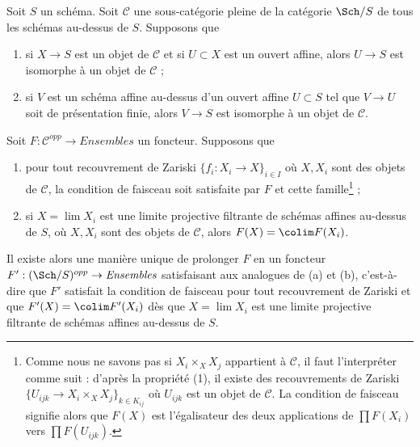 \begin{lemma}
\label{lemma-extend}
Soit $S$ un schéma. Soit $\mathcal{C}$ une sous-catégorie pleine
de la catégorie $\Sch/S$ de tous les schémas au-dessus de $S$. Supposons que
\begin{enumerate}
\item si $X \to S$ est un objet de $\mathcal{C}$ et si
$U \subset X$ est un ouvert affine, alors $U \to S$ est isomorphe
à un objet de $\mathcal{C}$ ;
\item si $V$ est un schéma affine au-dessus d'un ouvert affine $U \subset S$
tel que $V \to U$ soit de présentation finie, alors $V \to S$ est isomorphe
à un objet de $\mathcal{C}$.
\end{enumerate}
Soit $F : \mathcal{C}^{opp} \to \textit{Ensembles}$ un foncteur.
Supposons que
\begin{enumerate}
\item[(a)] pour tout recouvrement de Zariski $\{f_i : X_i \to X\}_{i \in I}$
où $X, X_i$ sont des objets de $\mathcal{C}$, la condition de
faisceau soit satisfaite par $F$ et cette famille\footnote{Comme nous
ne savons pas si $X_i \times_X X_j$ appartient à $\mathcal{C}$,
il faut l'interpréter comme suit : d'après la propriété (1),
il existe des recouvrements de Zariski $\{U_{ijk} \to X_i \times_X X_j\}_{k \in K_{ij}}$
où $U_{ijk}$ est un objet de $\mathcal{C}$. La condition de faisceau
signifie alors que $F(X)$ est l'égalisateur des deux applications
de $\prod F(X_i)$ vers $\prod F(U_{ijk})$.} ;
\item[(b)] si $X = \lim X_i$ est une limite projective filtrante de schémas affines
au-dessus de $S$, où $X, X_i$ sont des objets de $\mathcal{C}$, alors
$F(X) = \colim F(X_i)$.
\end{enumerate}
Il existe alors une manière unique de prolonger $F$ en un foncteur
$F' : (\Sch/S)^{opp} \to \textit{Ensembles}$ satisfaisant aux analogues de
(a) et (b), c'est-à-dire que $F'$ satisfait la condition de faisceau pour tout
recouvrement de Zariski et que $F'(X) = \colim F'(X_i)$ dès que $X = \lim X_i$
est une limite projective filtrante de schémas affines au-dessus de $S$.
\end{lemma}

